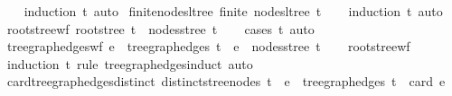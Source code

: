 \begin{isabellebody}
%
\isadelimproof
\ \ %
\endisadelimproof
%
\isatagproof
{}\isamarkupfalse%
\ {\isacharparenleft}{\kern0pt}induction\ t{\isacharparenright}{\kern0pt}\ auto%
\endisatagproof
{\isafoldproof}%
%
\isadelimproof
\isanewline
%
\endisadelimproof
\isanewline
{}\isamarkupfalse%
\ finite{\isacharunderscore}{\kern0pt}nodes{\isacharunderscore}{\kern0pt}ltree{\isacharcolon}{\kern0pt}\ {\isachardoublequoteopen}finite\ {\isacharparenleft}{\kern0pt}nodes{\isacharunderscore}{\kern0pt}ltree\ t{\isacharparenright}{\kern0pt}{\isachardoublequoteclose}\isanewline
%
\isadelimproof
\ \ %
\endisadelimproof
%
\isatagproof
{}\isamarkupfalse%
\ {\isacharparenleft}{\kern0pt}induction\ t{\isacharparenright}{\kern0pt}\ auto%
\endisatagproof
{\isafoldproof}%
%
\isadelimproof
%
\endisadelimproof
%
\isadelimdocument
%
\endisadelimdocument
%
\isatagdocument
%
\isamarkuptrue%
%
\endisatagdocument
{\isafolddocument}%
%
\isadelimdocument
%
\endisadelimdocument
{}\isamarkupfalse%
\ root{\isacharunderscore}{\kern0pt}stree{\isacharunderscore}{\kern0pt}wf{\isacharcolon}{\kern0pt}\ {\isachardoublequoteopen}root{\isacharunderscore}{\kern0pt}stree\ t\ {\isasymin}\ nodes{\isacharunderscore}{\kern0pt}stree\ t{\isachardoublequoteclose}\isanewline
%
\isadelimproof
\ \ %
\endisadelimproof
%
\isatagproof
{}\isamarkupfalse%
\ {\isacharparenleft}{\kern0pt}cases\ t{\isacharparenright}{\kern0pt}\ auto%
\endisatagproof
{\isafoldproof}%
%
\isadelimproof
\isanewline
%
\endisadelimproof
\isanewline
{}\isamarkupfalse%
\ tree{\isacharunderscore}{\kern0pt}graph{\isacharunderscore}{\kern0pt}edges{\isacharunderscore}{\kern0pt}wf{\isacharcolon}{\kern0pt}\ {\isachardoublequoteopen}e\ {\isasymin}\ tree{\isacharunderscore}{\kern0pt}graph{\isacharunderscore}{\kern0pt}edges\ t\ {\isasymLongrightarrow}\ e\ {\isasymsubseteq}\ nodes{\isacharunderscore}{\kern0pt}stree\ t{\isachardoublequoteclose}\isanewline
%
\isadelimproof
\ \ %
\endisadelimproof
%
\isatagproof
{}\isamarkupfalse%
\ root{\isacharunderscore}{\kern0pt}stree{\isacharunderscore}{\kern0pt}wf\ \isamarkupfalse%
\ {\isacharparenleft}{\kern0pt}induction\ t\ rule{\isacharcolon}{\kern0pt}\ tree{\isacharunderscore}{\kern0pt}graph{\isacharunderscore}{\kern0pt}edges{\isachardot}{\kern0pt}induct{\isacharparenright}{\kern0pt}\ auto%
\endisatagproof
{\isafoldproof}%
%
\isadelimproof
\isanewline
%
\endisadelimproof
\isanewline
{}\isamarkupfalse%
\ card{\isacharunderscore}{\kern0pt}tree{\isacharunderscore}{\kern0pt}graph{\isacharunderscore}{\kern0pt}edges{\isacharunderscore}{\kern0pt}distinct{\isacharcolon}{\kern0pt}\ {\isachardoublequoteopen}distinct{\isacharunderscore}{\kern0pt}stree{\isacharunderscore}{\kern0pt}nodes\ t\ {\isasymLongrightarrow}\ e\ {\isasymin}\ tree{\isacharunderscore}{\kern0pt}graph{\isacharunderscore}{\kern0pt}edges\ t\ {\isasymLongrightarrow}\ card\ e\ {\isacharequal}{\kern0pt}\ {}{\isachardoublequoteclose}\isanewline

\end{isabellebody}
